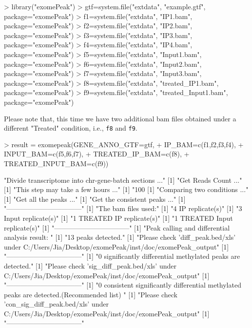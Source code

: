 \documentclass[]{article}
\newcommand{\Robject}[1]{{\texttt{#1}}}
\begin{document}
{\begin{Schunk}
\begin{Sinput}
> library("exomePeak")
> gtf=system.file("extdata", "example.gtf", package="exomePeak")
> f1=system.file("extdata", "IP1.bam", package="exomePeak")
> f2=system.file("extdata", "IP2.bam", package="exomePeak")
> f3=system.file("extdata", "IP3.bam", package="exomePeak")
> f4=system.file("extdata", "IP4.bam", package="exomePeak")
> f5=system.file("extdata", "Input1.bam", package="exomePeak")
> f6=system.file("extdata", "Input2.bam", package="exomePeak")
> f7=system.file("extdata", "Input3.bam", package="exomePeak")
> f8=system.file("extdata", "treated_IP1.bam", package="exomePeak")
> f9=system.file("extdata", "treated_Input1.bam", package="exomePeak")
\end{Sinput}
\end{Schunk}

Please note that, this time we have two additional bam files obtained under a different "Treated" condition, i.e., \Robject{f8} and \Robject{f9}.

\begin{Schunk}
\begin{Sinput}
> result = exomepeak(GENE_ANNO_GTF=gtf, 
+                    IP_BAM=c(f1,f2,f3,f4), 
+                    INPUT_BAM=c(f5,f6,f7),
+                    TREATED_IP_BAM=c(f8), 
+                    TREATED_INPUT_BAM=c(f9))
\end{Sinput}
\begin{Soutput}
[1] "Divide transcriptome into chr-gene-batch sections ..."
[1] "Get Reads Count ..."
[1] "This step may take a few hours ..."
[1] "100 %"
[1] "Comparing two conditions ..."
[1] "Get all the peaks ..."
[1] "Get the consistent peaks ..."
[1] "---------------------------------"
[1] "The bam files used:"
[1] "4 IP replicate(s)"
[1] "3 Input replicate(s)"
[1] "1 TREATED IP replicate(s)"
[1] "1 TREATED Input replicate(s)"
[1] "---------------------------------"
[1] "Peak calling and differential analysis result: "
[1] "13 peaks detected."
[1] "Please check 'diff_peak.bed/xls' under C:/Users/Jia/Desktop/exomePeak/inst/doc/exomePeak_output"
[1] "---------------------------------"
[1] "0 significantly differential methylated peaks are detected."
[1] "Please check 'sig_diff_peak.bed/xls' under C:/Users/Jia/Desktop/exomePeak/inst/doc/exomePeak_output"
[1] "---------------------------------"
[1] "0 consistent significantly differential methylated peaks are detected.(Recommended list) "
[1] "Please check 'con_sig_diff_peak.bed/xls' under C:/Users/Jia/Desktop/exomePeak/inst/doc/exomePeak_output"
[1] "---------------------------------"
\end{Soutput}
\end{Schunk}

}
\end{document}
